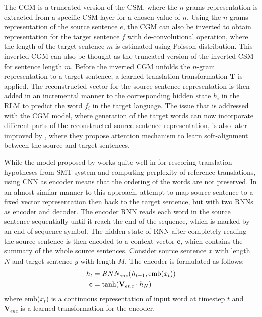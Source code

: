 \documentclass[12pt]{extarticle}
\begin{document}
The CGM is a truncated version of the CSM, where the $n$-grams representation is extracted from a specific CSM layer for a chosen value of $n$. Using the $n$-grams representation of the source sentence $e$, the CGM can also be inverted to obtain representation for the target sentence $f$ with de-convolutional operation, where the length of the target sentence $m$ is estimated using Poisson distribution. This inverted CGM can also be thought as the truncated version of the inverted CSM for sentence length $m$. Before the inverted CGM unfolds the $n$-gram representation to a target sentence, a learned translation transformation $\textbf{T}$ is applied. The reconstructed vector for the source sentence representation is then added in an incremental manner to the corresponding hidden state $h_{i}$ in the RLM to predict the word $f_{i}$ in the target language. The issue that is addressed with the CGM model, where generation of the target words can now incorporate different parts of the reconstructed source sentence representation, is also later improved by \citep{DBLP:journals/corr/BahdanauCB14}, where they propose attention mechanism to learn soft-alignment between the source and target sentences.

\newpage

While the model proposed by \citep{kalchbrenner-blunsom-2013-recurrent-continuous} works quite well in for rescoring translation hypotheses from SMT system and computing perplexity of reference translations, using CNN as encoder means that the ordering of the words are not preserved. In an almost similar manner to this approach, \citep{cho-etal-2014-learning} attempt to map source sentence to a fixed vector representation then back to the target sentence, but with two RNNs as encoder and decoder. The encoder RNN reads each word in the source sentence sequentially until it reach the end of the sequence, which is marked by an end-of-sequence symbol. The hidden state of RNN after completely reading the source sentence is then encoded to a context vector $\textbf{c}$, which contains the summary of the whole source sentences. Consider source sentence $x$ with length $N$ and target sentence $y$ with length $M$. The encoder is formulated as follows:
\begin{align}
h_{t} &= RNN_{enc}(h_{t-1}, \textnormal{emb}(x_{t})) \\
\textbf{c} &= \textnormal{tanh}(\textbf{V}_{enc} \cdot h_{N})
\end{align}
where emb($x_{t}$) is a continuous representation of input word at timestep $t$ and $\textbf{V}_{enc}$ is a learned transformation for the encoder. 
\end{document}
